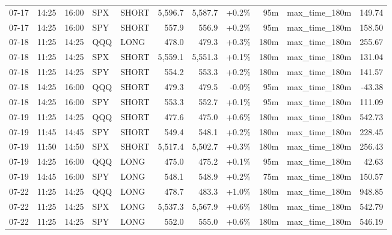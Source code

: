 \documentclass[11pt,a4paper,twoside]{article}
\begin{document}
\begin{center}
\begin{longtable}{>{\color{txtmain}}l l l l l r r r r >{\color{txtmain}}l r}
07-17 & 14:25 & 16:00 & SPX & SHORT & 5,596.7 & 5,587.7 & \textcolor{wingreen}{+0.2\%} & 95m & max\_time\_180m & \textcolor{wingreen}{149.74} \\
07-17 & 14:25 & 16:00 & SPY & SHORT & 557.9 & 556.9 & \textcolor{wingreen}{+0.2\%} & 95m & max\_time\_180m & \textcolor{wingreen}{158.50} \\
07-18 & 11:25 & 14:25 & QQQ & LONG & 478.0 & 479.3 & \textcolor{wingreen}{+0.3\%} & 180m & max\_time\_180m & \textcolor{wingreen}{255.67} \\
07-18 & 11:25 & 14:25 & SPX & SHORT & 5,559.1 & 5,551.3 & \textcolor{wingreen}{+0.1\%} & 180m & max\_time\_180m & \textcolor{wingreen}{131.04} \\
07-18 & 11:25 & 14:25 & SPY & SHORT & 554.2 & 553.3 & \textcolor{wingreen}{+0.2\%} & 180m & max\_time\_180m & \textcolor{wingreen}{141.57} \\
07-18 & 14:25 & 16:00 & QQQ & SHORT & 479.3 & 479.5 & \textcolor{lossred}{-0.0\%} & 95m & max\_time\_180m & \textcolor{lossred}{-43.38} \\
07-18 & 14:25 & 16:00 & SPY & SHORT & 553.3 & 552.7 & \textcolor{wingreen}{+0.1\%} & 95m & max\_time\_180m & \textcolor{wingreen}{111.09} \\
07-19 & 11:25 & 14:25 & QQQ & SHORT & 477.6 & 475.0 & \textcolor{wingreen}{+0.6\%} & 180m & max\_time\_180m & \textcolor{wingreen}{542.73} \\
07-19 & 11:45 & 14:45 & SPY & SHORT & 549.4 & 548.1 & \textcolor{wingreen}{+0.2\%} & 180m & max\_time\_180m & \textcolor{wingreen}{228.45} \\
07-19 & 11:50 & 14:50 & SPX & SHORT & 5,517.4 & 5,502.7 & \textcolor{wingreen}{+0.3\%} & 180m & max\_time\_180m & \textcolor{wingreen}{256.43} \\
07-19 & 14:25 & 16:00 & QQQ & LONG & 475.0 & 475.2 & \textcolor{wingreen}{+0.1\%} & 95m & max\_time\_180m & \textcolor{wingreen}{42.63} \\
07-19 & 14:45 & 16:00 & SPY & LONG & 548.1 & 548.9 & \textcolor{wingreen}{+0.2\%} & 75m & max\_time\_180m & \textcolor{wingreen}{150.57} \\
07-22 & 11:25 & 14:25 & QQQ & LONG & 478.7 & 483.3 & \textcolor{wingreen}{+1.0\%} & 180m & max\_time\_180m & \textcolor{wingreen}{948.85} \\
07-22 & 11:25 & 14:25 & SPX & LONG & 5,537.3 & 5,567.9 & \textcolor{wingreen}{+0.6\%} & 180m & max\_time\_180m & \textcolor{wingreen}{542.79} \\
07-22 & 11:25 & 14:25 & SPY & LONG & 552.0 & 555.0 & \textcolor{wingreen}{+0.6\%} & 180m & max\_time\_180m & \textcolor{wingreen}{546.19} \\

\end{longtable}
\end{center}
\end{document}
